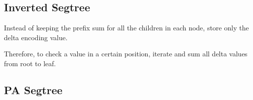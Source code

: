 

    \subsection{Inverted Segtree}

        Instead of keeping the prefix sum for all the children in each node, store only the delta encoding value.

        Therefore, to check a value in a certain position, iterate and sum all delta values from root to leaf.


    \subsection{PA Segtree}

